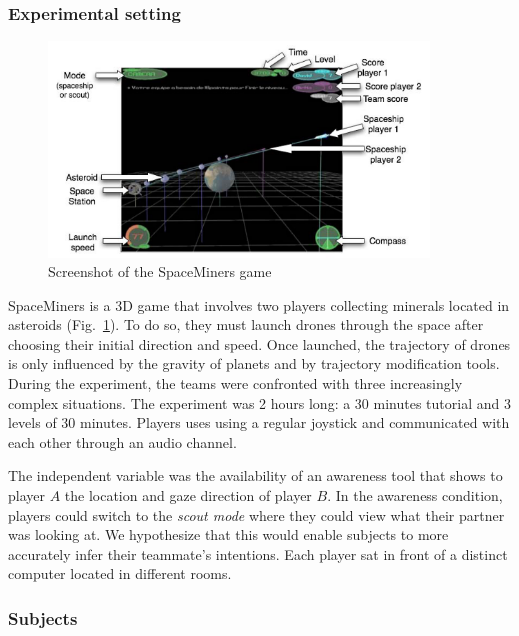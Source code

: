 \documentclass[natbib]{svjour3}
\begin{document}
\subsubsection*{Experimental setting}

\begin{figure}
        \centering
        \includegraphics[width=0.9\textwidth]{image4.png}
        \caption{Screenshot of the {\sc SpaceMiners} game}
        \label{study1:spaceminer}
\end{figure}


{\sc SpaceMiners} is a 3D game that involves two players collecting minerals located
in asteroids (Fig.~\ref{study1:spaceminer}). To do so, they must launch drones through
the space after choosing their initial direction and speed. Once launched, the
trajectory of drones is only influenced by the gravity of planets and by
trajectory modification tools.  During the experiment, the teams were confronted
with three increasingly complex situations. The experiment was 2 hours long: a
30 minutes tutorial and 3 levels of 30 minutes. Players uses using a regular
joystick and communicated with each other through an audio channel.

The independent variable was the availability of an awareness tool that shows to
player $A$  the location and gaze direction of player $B$. In the awareness
condition, players could switch to the \emph{scout mode} where they could view what
their partner was looking at. We hypothesize that this would enable subjects to
more accurately infer their teammate's intentions. Each player sat in front of a
distinct computer located in different rooms. 

\subsubsection*{Subjects}
\end{document}
